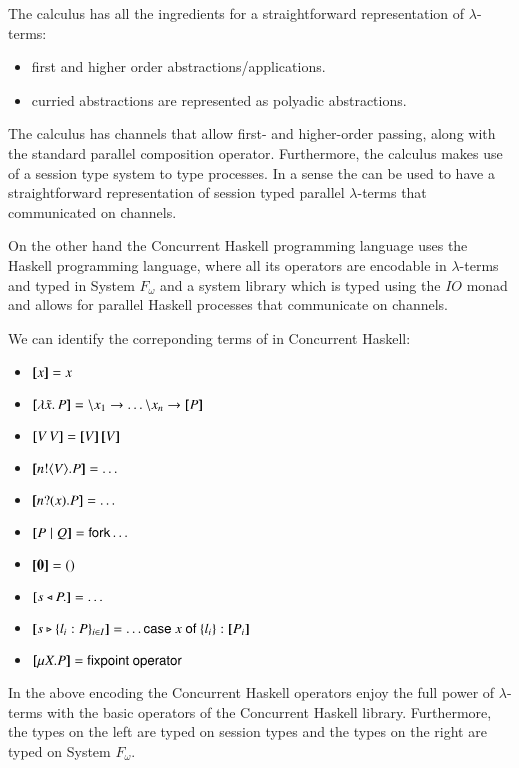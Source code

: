 The \PHOpp calculus has all the ingredients for a straightforward
representation of $\lambda$-terms:
\begin{itemize}
	\item	first and higher order abstractions/applications.
	\item	curried abstractions are represented as polyadic abstractions.
\end{itemize}
The \PHOpp calculus has channels that allow first- and higher-order
passing, along with the standard parallel composition operator.
Furthermore, the calculus makes use of a session type system to
type processes.
In a sense the \PHOpp can be used to have a straightforward representation
of session typed parallel $\lambda$-terms that communicated on channels.

On the other hand the Concurrent Haskell programming language uses the
Haskell programming language, where all its operators are encodable in
$\lambda$-terms and typed in System $F_{\omega}$ and a system
library which is typed using the $IO$ monad 
and allows for parallel Haskell processes that communicate on channels.

We can identify the correponding terms of \PHOpp in Concurrent Haskell:
\begin{itemize}
	\item	$[\!\![x]\!\!] = x$
	\item	$\map{\abs{\tilde{x}}{P}} = \backslash x_1 \rightarrow \dots \backslash x_n \rightarrow \map{P}$
	\item	$\map{\appl{V}{V}} = \appl{\map{V}}{\map{V}}$
	\item	$[\!\![n ! \langle V \rangle . P]\!\!] = \dots$
	\item	$[\!\![n ? (x) . P]\!\!] = \dots$
	\item	$[\!\![P\;|\; Q]\!\!] = \mathsf{fork} \dots$
	\item	$[\!\![\mathbf{0}]\!\!] = ()$
	\item	$[\!\![s \triangleleft P .]\!\!] = \dots$
	\item	$\map{\bbra{s}{l_i: P}_{i \in I}} = \dots \mathsf{case}\ x\ \mathsf{of}\ \set{l_i}: \map{P_i}$
	\item	$\map{\recp{X}{P}} = \mathsf{fixpoint\ operator}$
\end{itemize}

In the above encoding the Concurrent Haskell operators enjoy the full power
of $\lambda$-terms with the basic operators of the Concurrent Haskell library.
Furthermore, the types on the left are typed on session types and the
types on the right are typed on System $F_\omega$.


